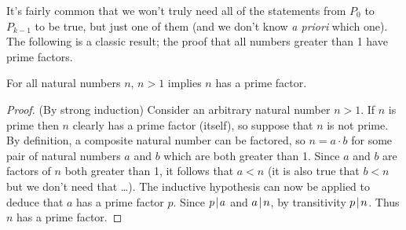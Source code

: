 It's fairly common that we won't truly need all of the statements from $P_0$
to $P_{k-1}$ to be true, but just one of them (and we don't know {\em a priori} 
which one).  The following is a classic result; the proof that all numbers
greater than 1 have prime factors.

\begin{thm} For all natural numbers $n$, $n > 1$ implies $n$ has a prime 
factor.
\end{thm}

\begin{proof} (By strong induction)
Consider an arbitrary natural number $n>1$.  If $n$ is prime then $n$ clearly
has a prime factor (itself), so suppose that $n$ is not prime.  By 
definition, a composite
natural number can be factored, so $n=a \cdot b$ for some pair of natural
numbers $a$ and $b$ which are both greater than 1.  Since $a$ and $b$ are  
factors of $n$ both greater than 1, it follows that $a < n$ (it is also 
true that $b < n$ but we don't need that \ldots).  The inductive hypothesis
can now be applied to deduce that $a$ has a prime factor $p$.  Since
$p \!\mid\! a$ and $a \!\mid\! n$, by transitivity $p \!\mid\! n$.  Thus
$n$ has a prime factor.
\end{proof}
  

\newpage






